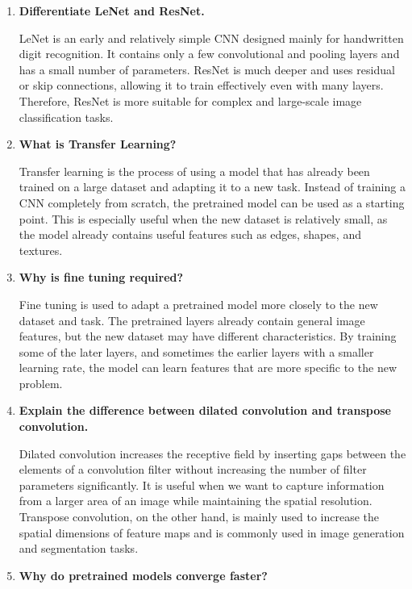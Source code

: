 \documentclass[11pt]{article}
\begin{document}
\begin{enumerate}
Residual learning was introduced to make it easier to train very deep neural networks. Instead of directly learning the complete mapping, the network learns the difference, or residual, between the input and the desired output. Skip connections allow the input to bypass some layers, which helps reduce the vanishing gradient problem and makes deeper networks easier to optimize.
\vspace{5mm}
\item \textbf{Differentiate LeNet and ResNet.}

LeNet is an early and relatively simple CNN designed mainly for handwritten digit recognition. It contains only a few convolutional and pooling layers and has a small number of parameters. ResNet is much deeper and uses residual or skip connections, allowing it to train effectively even with many layers. Therefore, ResNet is more suitable for complex and large-scale image classification tasks.
\vspace{5mm}
\item \textbf{What is Transfer Learning?}

Transfer learning is the process of using a model that has already been trained on a large dataset and adapting it to a new task. Instead of training a CNN completely from scratch, the pretrained model can be used as a starting point. This is especially useful when the new dataset is relatively small, as the model already contains useful features such as edges, shapes, and textures.
\vspace{5mm}
\item \textbf{Why is fine tuning required?}

Fine tuning is used to adapt a pretrained model more closely to the new dataset and task. The pretrained layers already contain general image features, but the new dataset may have different characteristics. By training some of the later layers, and sometimes the earlier layers with a smaller learning rate, the model can learn features that are more specific to the new problem.
\vspace{5mm}
\item \textbf{Explain the difference between dilated convolution and transpose convolution.}

Dilated convolution increases the receptive field by inserting gaps between the elements of a convolution filter without increasing the number of filter parameters significantly. It is useful when we want to capture information from a larger area of an image while maintaining the spatial resolution. Transpose convolution, on the other hand, is mainly used to increase the spatial dimensions of feature maps and is commonly used in image generation and segmentation tasks.
\vspace{5mm}
\item \textbf{Why do pretrained models converge faster?}


\end{enumerate}
\end{document}
